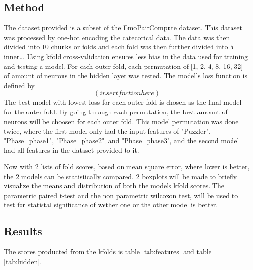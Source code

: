 \documentclass[12pt]{article}
\begin{document}
\subsection{Method}
The dataset provided is a subset of the EmoPairCompute dataset.
This dataset was processed by one-hot encoding the catecorical data.
The data was then divided into 10 chunks or folds and each fold was then further divided into 5 inner...
Using kfold cross-validation ensures less bias in the data used for training and testing a model.
For each outer fold, each permutation of [1, 2, 4, 8, 16, 32] of amount of neurons in the hidden layer was tested.
The model's loss function is defined by \[(insert fnction here)\]
The best model with lowest loss for each outer fold is chosen as the final model for the outer fold.
By going through each permutation, the best amount of neurons will be choosen for each outer fold.
This model permutation was done twice, where the first model only had the input features of "Puzzler", "Phase\_phase1", "Phase\_phase2", and "Phase\_phase3", and the second model had all features in the dataset provided to it.

Now with 2 lists of fold scores, based on mean square error, where lower is better, the 2 models can be statistically compared.
2 boxplots will be made to briefly visualize the means and distribution of both the models kfold scores.
The parametric paired t-test and the non parametric wilcoxon test, will be used to test for statistal significance of wether one or the other model is better.

\subsection{Results}
The scores producted from the kfolds is table \ref{tab:features} and table \ref{tab:hidden}.
\end{document}
